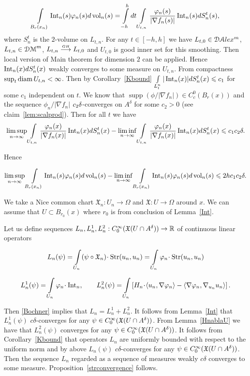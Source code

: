$$ \int\limits_{B_r(x_n)}\operatorname{Int}_n(s)\varphi_n(s)d\operatorname{vol}_n(s)
=\int\limits_{-h}^{h} d t\int\limits_{ U_{t,n}}
 \frac{\varphi_n(s)}{|\nabla f_n(s)|}\operatorname{Int}_n(s)d S_n^t(s),$$
 where $ S_n^t$ is the $2$-volume on $ L_{t,n}$.
 For any $t\in[-h,h]$ we have
 $L_{t,0}\in\mathcal{DA}lex^m$,
$L_{t,n}\in\mathcal{DM}^m$,
$L_{t,n}\stackrel{\hbox{\tiny $GH$}}{\longrightarrow} L_{t,0}$
 and $U_{t,0}$ is good inner set for this smoothing.
Then local version of Main theorem  for dimension $2$ can be applied.
 Hence $\operatorname{Int}_n(x)dS_n^t(x)$ weakly converges to some measure on $U_{t,n}$.
 From 
compactness  $\sup_{t} \operatorname{diam} U_{t,n}<\infty$.
 Then by  Corollary~\ref{Kbound} 
$\int\limits_{ L_t^n}
 |\operatorname{Int}_n(x)|dS_n^t(x)\leqslant c_1$ for some $c_1$ independent on $t$. We know that
 $\operatorname{supp}(\phi/{|\nabla  f_n|})\in C^0_c(B_r(x)) $
and the sequence
  ${\phi_n}/{|\nabla  f_n|}$
$c_2\delta$-converges on $A^\delta$ 
for some $c_2>0$
(see claim~\ref{lem:scalprod}).
Then for all $t$ we have
$$\limsup_{n\to\infty}\int\limits_{U_{t,n}} \frac{\varphi_n(x)}
{|\nabla f_n(x)|}\operatorname{Int}_n(x)dS_n^t(x)-
\liminf_{n\to\infty}\int\limits_{U_{t,n}} \frac{\varphi_n(x)}{|\nabla f_n(x)|}\operatorname{Int}_n(x)dS_n^t(x)
\leqslant c_1c_2\delta.$$

Hence

$$
\limsup_{n\to\infty}
 \int\limits_{B_r(x_n)}\operatorname{Int}_n(s)\varphi_n(s)d\operatorname{vol}_n(s)-
\liminf_{n\to\infty}
 \int\limits_{B_r(x_n)}\operatorname{Int}_n(s)\varphi_n(s)d\operatorname{vol}_n(s)
\leqslant 2hc_1c_2\delta.$$
\qeds

We take a Nice common chart 
$\mathfrak{X}_n:U_n\to\Omega$ and
$\mathfrak{X}:U\to\Omega$ around $x$.
We can assume 
that $U\subset B_{r_0}(x)$ where $r_0$ is 
from conclusion of Lemma~\ref{Int}.


Let us define sequences 
$L_n, L_n^1, L_n^2:C^\infty_0(\mathfrak X(U\cap A^\delta))\to \mathbb{R}$
of continuous linear operators

$$L_n(\psi)=
\int\limits_{U_n}(\psi\circ\mathfrak X_n )\cdot \Str(u_n, u_n)=
\int\limits_{U_n} \phi_n\cdot \Str(u_n, u_n)
$$

$$L_n^1(\psi)=
\int\limits_{U_n} \phi_n\cdot \Int_n,
\qquad L_n^2(\psi)=
\int\limits_{U_n}
 \l[H_n\cdot\<u_n,\nabla\phi_n\>- \<\nabla\phi_n,\nabla_{u_n} u_n\> \r].$$

Then \ref{Bochner} implies that $L_n=L_n^1+L_n^2$.
It follows from
Lemma~\ref{Int} that 
$L^1_n(\psi)$ $c\delta$-converges for any $\psi\in C^\infty_0(\mathfrak X(U\cap A^\delta))$.
From Lemma~\ref{HnablaU} we have that
$L^2_n(\psi)$ converges for any $\psi\in C^\infty_0(\mathfrak X(U\cap A^\delta))$.
It follows from Corollary~\ref{Kbound}  that operators $L_n$
are uniformly bounded with respect to the uniform norm and by above
$L_n(\psi)$ $c\delta$-converges for any $\psi\in C^\infty_0(\mathfrak X(U\cap A^\delta))$.
Then the sequence $L_n$ regarded as a sequence 
of measures weakly $c\delta$ converges to some 
measure.
Proposition~\ref{strconvergence} follows.
\qeds
